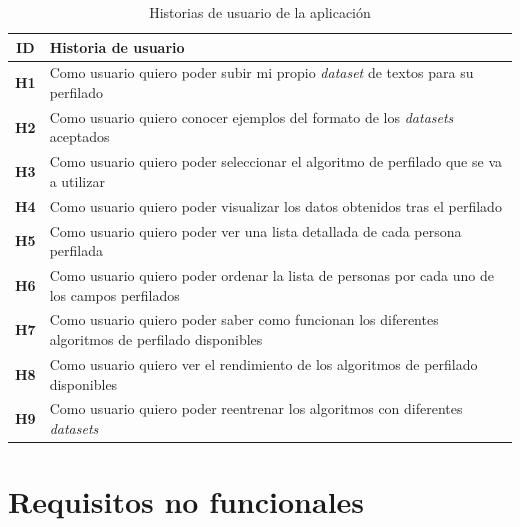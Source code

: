 \bigskip
\begin{table}[H]
	\centering
	\begin{tabular}{|c|p{11cm}|}
		\rowcolor{udcpink!25}
		\hline
		\small \textbf{ID}                 & \small \textbf{Historia de usuario}                                                                      \\\hline
		\small \textbf{H1} \label{req:hu1} & \small Como usuario quiero poder subir mi propio \textit{dataset} de textos para su perfilado            \\ \hline
		\small \textbf{H2} \label{req:hu2} & \small Como usuario quiero conocer ejemplos del formato de los \textit{datasets} aceptados               \\ \hline
		\small \textbf{H3} \label{req:hu3} & \small Como usuario quiero poder seleccionar el algoritmo de perfilado que se va a utilizar              \\ \hline
		\small \textbf{H4} \label{req:hu4} & \small Como usuario quiero poder visualizar los datos obtenidos tras el perfilado                        \\ \hline
		\small \textbf{H5} \label{req:hu5} & \small Como usuario quiero poder ver una lista detallada de cada persona perfilada                       \\ \hline
		\small \textbf{H6} \label{req:hu6} & \small Como usuario quiero poder ordenar la lista de personas por cada uno de los campos perfilados      \\ \hline
		\small \textbf{H7} \label{req:hu7} & \small Como usuario quiero poder saber como funcionan los diferentes algoritmos de perfilado disponibles \\ \hline
		\small \textbf{H8} \label{req:hu8} & \small Como usuario quiero ver el rendimiento de los algoritmos de perfilado disponibles                 \\ \hline
		\small \textbf{H9} \label{req:hu9} & \small Como usuario quiero poder reentrenar los algoritmos con diferentes \textit{datasets}              \\ \hline
	\end{tabular}
	\caption{Historias de usuario de la aplicación}
	\label{tab:historias_usuario}
\end{table}

\newpage
\section{Requisitos no funcionales}
\label{sec:analisis_requisitos_no_funcionales}

